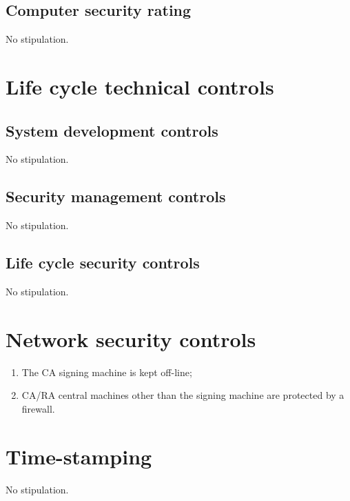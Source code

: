 \subsection{Computer security rating}

No stipulation.

\section{Life cycle technical controls}
\subsection{System development controls}

No stipulation.

\subsection{Security management controls}

No stipulation.

\subsection{Life cycle security controls}

No stipulation.

\section{Network security controls}

\begin{enumerate}
\item{The CA signing machine is kept off-line;}
\item{CA/RA central machines other than the signing machine are protected by a firewall.}
\end{enumerate}

\section{Time-stamping}

No stipulation.

